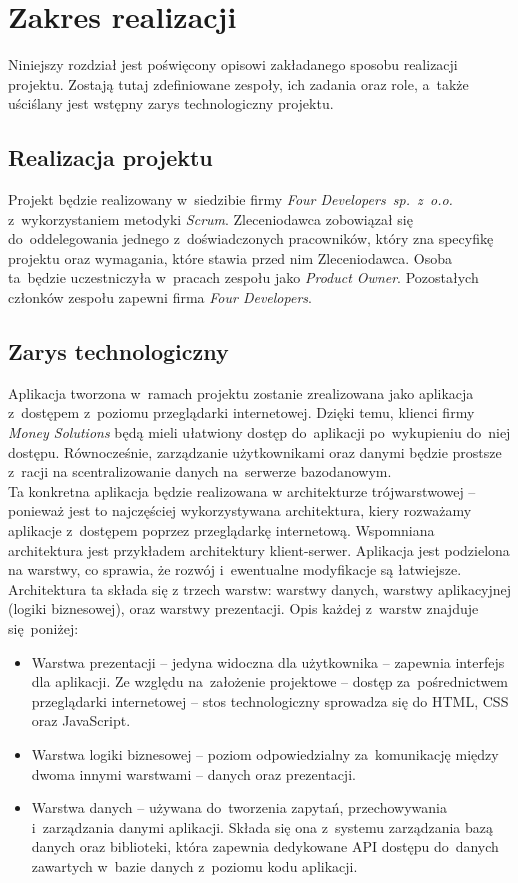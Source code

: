 \section{Zakres realizacji}
Niniejszy rozdział jest poświęcony opisowi zakładanego sposobu realizacji projektu. Zostają tutaj zdefiniowane zespoły, ich zadania oraz role, a~także uściślany jest wstępny zarys technologiczny projektu.

\subsection{Realizacja projektu}
Projekt będzie realizowany w~siedzibie firmy \emph{Four Developers~sp.~z~o.o.} z~wykorzystaniem metodyki \emph{Scrum}. Zleceniodawca zobowiązał się do~oddelegowania jednego z~doświadczonych pracowników, który zna specyfikę projektu oraz wymagania, które stawia przed nim Zleceniodawca. Osoba ta~będzie uczestniczyła w~pracach zespołu jako \emph{Product Owner}. Pozostałych członków zespołu zapewni firma \emph{Four Developers}.

\subsection{Zarys technologiczny}
Aplikacja tworzona w~ramach projektu zostanie zrealizowana jako aplikacja z~dostępem z~poziomu przeglądarki internetowej. Dzięki temu, klienci firmy \emph{Money Solutions} będą mieli ułatwiony dostęp do~aplikacji po~wykupieniu do~niej dostępu. Równocześnie, zarządzanie użytkownikami oraz danymi będzie prostsze z~racji na scentralizowanie danych na~serwerze bazodanowym.\\

Ta konkretna aplikacja będzie realizowana w architekturze trójwarstwowej -- ponieważ jest to najczęściej wykorzystywana architektura, kiery rozważamy aplikacje z~dostępem poprzez przeglądarkę internetową. Wspomniana architektura jest przykładem architektury klient-serwer. Aplikacja jest podzielona na warstwy, co sprawia, że rozwój i~ewentualne modyfikacje są łatwiejsze. Architektura ta składa się z trzech warstw: warstwy danych, warstwy aplikacyjnej  (logiki biznesowej), oraz warstwy prezentacji. Opis każdej z~warstw znajduje się poniżej:

\begin{itemize}
   \item Warstwa prezentacji -- jedyna widoczna dla użytkownika -- zapewnia interfejs dla aplikacji. Ze względu na~założenie projektowe -- dostęp za~pośrednictwem przeglądarki internetowej -- stos technologiczny sprowadza się do HTML, CSS oraz JavaScript.
   \item Warstwa logiki biznesowej -- poziom odpowiedzialny za~komunikację między dwoma innymi warstwami -- danych oraz prezentacji.
   \item Warstwa danych -- używana do~tworzenia zapytań, przechowywania i~zarządzania danymi aplikacji. Składa się ona z~systemu zarządzania bazą danych oraz biblioteki, która zapewnia dedykowane API dostępu do~danych zawartych w~bazie danych z~poziomu kodu aplikacji.
\end{itemize}

